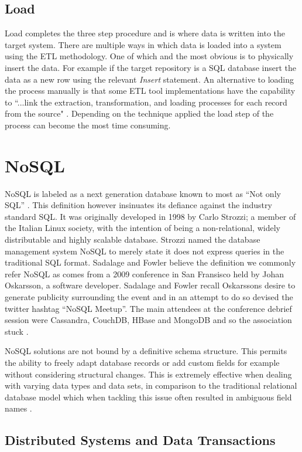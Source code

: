 \subsection{Load}
Load completes the three step procedure and is where data is written into the target system. There are multiple ways in which data is loaded into a system using the ETL methodology. One of which and the most obvious is to physically insert the data. For example if the target repository is a SQL database insert the data as a new row using the relevant \textit{Insert} statement. An alternative to loading the process manually is that some ETL tool implementations have the capability to ``...link the extraction, transformation, and loading processes for each record from the source" \cite{etlref2}. Depending on the technique applied the load step of the process can become the most time consuming.

\section{NoSQL}\label{nosql}
NoSQL is labeled as a next generation database known to most as ``Not only SQL'' \cite{nosql1}. This definition however insinuates its defiance against the industry standard SQL. It was originally developed in 1998 by Carlo Strozzi; a member of the Italian Linux society, with the intention of being a non-relational, widely distributable and highly scalable database. Strozzi named the database management system NoSQL to merely state it does not express queries in the traditional SQL format. Sadalage and Fowler believe the definition we commonly refer NoSQL as comes from a 2009 conference in San Fransisco held by Johan Oskarsson, a software developer. Sadalage and Fowler recall Oskarssons desire to generate publicity surrounding the event and in an attempt to do so devised the twitter hashtag ``NoSQL Meetup''. The main attendees at the conference debrief session were Cassandra, CouchDB, HBase and MongoDB and so the association stuck \cite{nosql1}.

NoSQL solutions are not bound by a definitive schema structure. This permits the ability to freely adapt database records or add custom fields for example without considering structural changes. This is extremely effective when dealing with varying data types and data sets, in comparison to the traditional relational database model which when tackling this issue often resulted in ambiguous field names  \cite{nosql1}.

\subsection{Distributed Systems and Data Transactions}\label{distrosystems}
